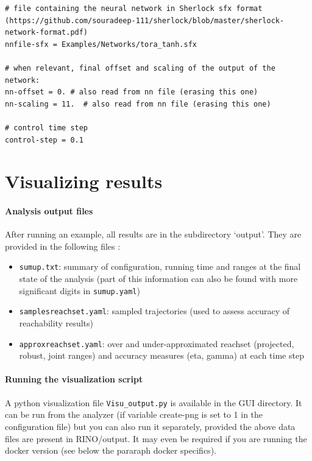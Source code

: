 \documentclass{article}
\begin{document}
\begin{verbatim}
# file containing the neural network in Sherlock sfx format (https://github.com/souradeep-111/sherlock/blob/master/sherlock-network-format.pdf) 
nnfile-sfx = Examples/Networks/tora_tanh.sfx

# when relevant, final offset and scaling of the output of the network:
nn-offset = 0. # also read from nn file (erasing this one)
nn-scaling = 11.  # also read from nn file (erasing this one)

# control time step
control-step = 0.1
\end{verbatim}



\section{Visualizing results \label{visu}}

\paragraph{Analysis output files}
After running an example, all results are in the subdirectory ‘output’. They are provided in the following files : 
\begin{itemize}[noitemsep]
\item \texttt{sumup.txt}: summary of configuration, running time and ranges at the final state of the analysis (part of this information can also be found with more significant digits in \texttt{sumup.yaml})
\item \texttt{samplesreachset.yaml}: sampled trajectories (used to assess accuracy of reachability results)
\item \texttt{approxreachset.yaml}: over and under-approximated reachset (projected, robust, joint ranges) and accuracy measures (eta, gamma) at each time step 
\end{itemize}

\paragraph{Running the visualization script}
A python visualization file \texttt{Visu\_output.py} is available in the GUI directory. It can be run from the analyzer (if variable create-png is set to 1 in the configuration file) but you can also run it separately,  provided the above data files are present in RINO/output.  It may even be required if you are running the docker version (see below the pararaph docker specifics).
\end{document}
